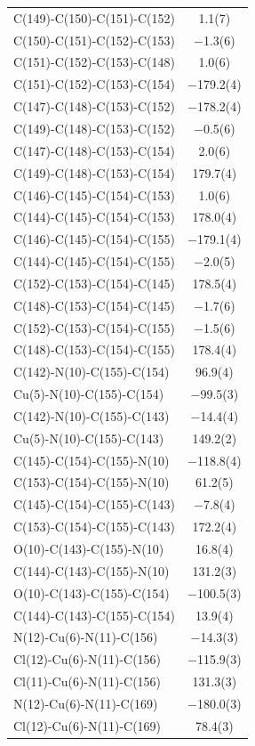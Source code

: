 \begin{center}
{\begin{supertabular}{p{1.8in}c}
C(149)-C(150)-C(151)-C(152)&1.1(7)\\
C(150)-C(151)-C(152)-C(153)&$-$1.3(6)\\
C(151)-C(152)-C(153)-C(148)&1.0(6)\\
C(151)-C(152)-C(153)-C(154)&$-$179.2(4)\\
C(147)-C(148)-C(153)-C(152)&$-$178.2(4)\\
C(149)-C(148)-C(153)-C(152)&$-$0.5(6)\\
C(147)-C(148)-C(153)-C(154)&2.0(6)\\
C(149)-C(148)-C(153)-C(154)&179.7(4)\\
C(146)-C(145)-C(154)-C(153)&1.0(6)\\
C(144)-C(145)-C(154)-C(153)&178.0(4)\\
C(146)-C(145)-C(154)-C(155)&$-$179.1(4)\\
C(144)-C(145)-C(154)-C(155)&$-$2.0(5)\\
C(152)-C(153)-C(154)-C(145)&178.5(4)\\
C(148)-C(153)-C(154)-C(145)&$-$1.7(6)\\
C(152)-C(153)-C(154)-C(155)&$-$1.5(6)\\
C(148)-C(153)-C(154)-C(155)&178.4(4)\\
C(142)-N(10)-C(155)-C(154)&96.9(4)\\
Cu(5)-N(10)-C(155)-C(154)&$-$99.5(3)\\
C(142)-N(10)-C(155)-C(143)&$-$14.4(4)\\
Cu(5)-N(10)-C(155)-C(143)&149.2(2)\\
C(145)-C(154)-C(155)-N(10)&$-$118.8(4)\\
C(153)-C(154)-C(155)-N(10)&61.2(5)\\
C(145)-C(154)-C(155)-C(143)&$-$7.8(4)\\
C(153)-C(154)-C(155)-C(143)&172.2(4)\\
O(10)-C(143)-C(155)-N(10)&16.8(4)\\
C(144)-C(143)-C(155)-N(10)&131.2(3)\\
O(10)-C(143)-C(155)-C(154)&$-$100.5(3)\\
C(144)-C(143)-C(155)-C(154)&13.9(4)\\
N(12)-Cu(6)-N(11)-C(156)&$-$14.3(3)\\
Cl(12)-Cu(6)-N(11)-C(156)&$-$115.9(3)\\
Cl(11)-Cu(6)-N(11)-C(156)&131.3(3)\\
N(12)-Cu(6)-N(11)-C(169)&$-$180.0(3)\\
Cl(12)-Cu(6)-N(11)-C(169)&78.4(3)\\

\end{supertabular}}
\end{center}

